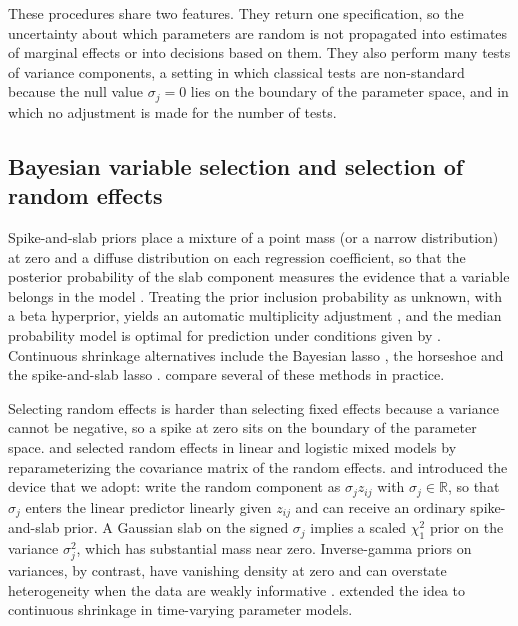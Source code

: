 These procedures share two features. They return one specification, so the uncertainty about which parameters are random is not propagated into estimates of marginal effects or into decisions based on them. They also perform many tests of variance components, a setting in which classical tests are non-standard because the null value $\sigma_j=0$ lies on the boundary of the parameter space, and in which no adjustment is made for the number of tests.

\subsection{Bayesian variable selection and selection of random effects}

Spike-and-slab priors place a mixture of a point mass (or a narrow distribution) at zero and a diffuse distribution on each regression coefficient, so that the posterior probability of the slab component measures the evidence that a variable belongs in the model \citep{mitchell1988bayesian, george1993variable, ishwaran2005spike}. Treating the prior inclusion probability as unknown, with a beta hyperprior, yields an automatic multiplicity adjustment \citep{scott2010bayes}, and the median probability model is optimal for prediction under conditions given by \citet{barbieri2004optimal}. Continuous shrinkage alternatives include the Bayesian lasso \citep{park2008bayesian, kyung2010penalized}, the horseshoe \citep{carvalho2010horseshoe} and the spike-and-slab lasso \citep{rockova2018spike}. \citet{ohara2009review} compare several of these methods in practice.

Selecting random effects is harder than selecting fixed effects because a variance cannot be negative, so a spike at zero sits on the boundary of the parameter space. \citet{chen2003random} and \citet{kinney2007fixed} selected random effects in linear and logistic mixed models by reparameterizing the covariance matrix of the random effects. \citet{fruhwirth2008bayesian} and \citet{fruhwirth2010stochastic} introduced the device that we adopt: write the random component as $\sigma_j z_{ij}$ with $\sigma_j\in\mathbb{R}$, so that $\sigma_j$ enters the linear predictor linearly given $z_{ij}$ and can receive an ordinary spike-and-slab prior. A Gaussian slab on the signed $\sigma_j$ implies a scaled $\chi^2_1$ prior on the variance $\sigma_j^2$, which has substantial mass near zero. Inverse-gamma priors on variances, by contrast, have vanishing density at zero and can overstate heterogeneity when the data are weakly informative \citep{gelman2006prior}. \citet{bitto2019achieving} extended the idea to continuous shrinkage in time-varying parameter models.

